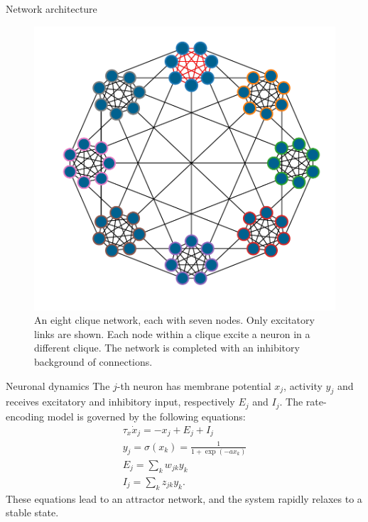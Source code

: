 \documentclass[final,hyperref={pdfpagelabels=false}]{beamer}
\begin{document}
\begin{frame}
\begin{columns}
\begin{column}{.30\textwidth}
\begin{minipage}[T]{.95\textwidth}
{\begin{block}{Network architecture}
							
							\begin{figure}
								\centering
								\includegraphics[width=.7\linewidth]{network2.pdf}
								\caption{An eight clique network, each with seven nodes. Only excitatory links are shown. Each node within a clique excite a neuron in a different clique. The network is completed with an inhibitory background of connections.}
								\label{fig:network}
							\end{figure}
						\end{block}		
										
						\vfill
						\begin{block}{Neuronal dynamics}
							 The $j$-th neuron has membrane potential $x_j$, activity $y_j$ and receives excitatory and inhibitory input, respectively $E_j$ and $I_j$. The rate-encoding model is governed by the following equations:
							\begin{gather*}
								\tau_x \dot{x}_j = -x_j + E_j + I_j\\
								y_j = \sigma \left(x_k\right) = \frac{1}{1+\exp \left(-a x_k \right) } \\
								E_j = \sum_{k} w_{jk} y_k \\
								I_j = \sum_k z_{jk} y_k.
								\label{eq:neuron}
							\end{gather*}
							These equations lead to an attractor network, and the system rapidly relaxes to a stable state.
							

\end{block}}
\end{minipage}
\end{column}
\end{columns}
\end{frame}
\end{document}
